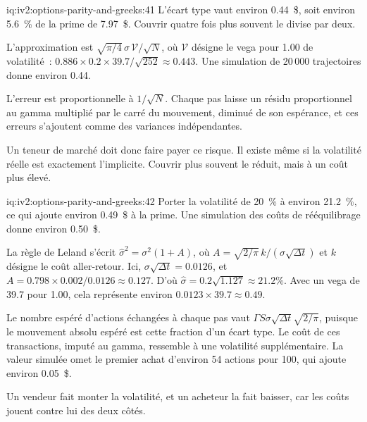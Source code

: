 \begin{solution}{iq:iv2:options-parity-and-greeks:41}
L'écart type vaut environ 0.44~\$, soit environ 5.6~\% de la prime de 7.97~\$. Couvrir quatre fois plus souvent le divise par deux.

L'approximation est $\sqrt{\pi/4}\,\sigma\,\mathcal V/\sqrt N$, où $\mathcal V$ désigne le vega pour 1.00 de volatilité~: $0.886 \times 0.2 \times 39.7/\sqrt{252} \approx 0.443$. Une simulation de 20\,000 trajectoires donne environ 0.44.

L'erreur est proportionnelle à $1/\sqrt N$. Chaque pas laisse un résidu proportionnel au gamma multiplié par le carré du mouvement, diminué de son espérance, et ces erreurs s'ajoutent comme des variances indépendantes.

Un teneur de marché doit donc faire payer ce risque. Il existe même si la volatilité réelle est exactement l'implicite. Couvrir plus souvent le réduit, mais à un coût plus élevé.

\end{solution}

\begin{solution}{iq:iv2:options-parity-and-greeks:42}
Porter la volatilité de 20~\% à environ 21.2~\%, ce qui ajoute environ 0.49~\$ à la prime. Une simulation des coûts de rééquilibrage donne environ 0.50~\$.

La règle de Leland s'écrit $\hat\sigma^2 = \sigma^2(1 + A)$, où $A = \sqrt{2/\pi}\,k/(\sigma\sqrt{\Delta t})$ et $k$ désigne le coût aller-retour. Ici, $\sigma\sqrt{\Delta t} = 0.0126$, et $A = 0.798 \times 0.002/0.0126 \approx 0.127$. D'où $\hat\sigma = 0.2\sqrt{1.127} \approx 21.2\%$. Avec un vega de 39.7 pour 1.00, cela représente environ $0.0123 \times 39.7 \approx 0.49$.

Le nombre espéré d'actions échangées à chaque pas vaut $\Gamma S\sigma\sqrt{\Delta t}\sqrt{2/\pi}$, puisque le mouvement absolu espéré est cette fraction d'un écart type. Le coût de ces transactions, imputé au gamma, ressemble à une volatilité supplémentaire. La valeur simulée omet le premier achat d'environ 54 actions pour 100, qui ajoute environ 0.05~\$.

Un vendeur fait monter la volatilité, et un acheteur la fait baisser, car les coûts jouent contre lui des deux côtés.

\end{solution}

